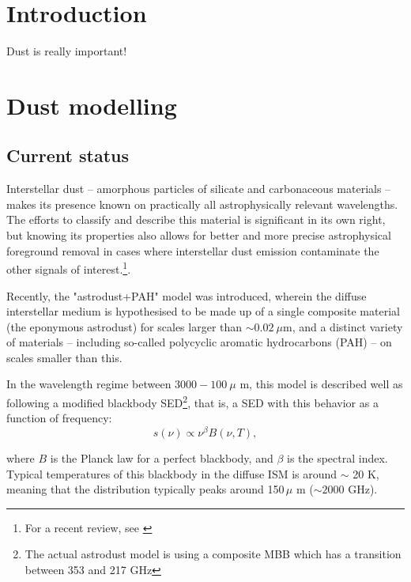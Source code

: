 \documentclass{aa}
\begin{document}
   \maketitle

\setcounter{tocdepth}{2}
\tableofcontents
   
\section{Introduction}
Dust is really important!

\clearpage
\section{Dust modelling}
\subsection{Current status}
Interstellar dust -- amorphous particles of silicate and carbonaceous materials -- makes its presence known on practically all astrophysically relevant wavelengths. The efforts to classify and describe this material is significant in its own right, but knowing its properties also allows for better and more precise astrophysical foreground removal in cases where interstellar dust emission contaminate the other signals of interest.\footnote{For a recent review, see \cite{Hensley2021}}.

Recently, the "astrodust+PAH" model \citep{Hensley2023} was introduced, wherein the diffuse interstellar medium is hypothesised to be made up of a single composite material (the eponymous astrodust) for scales larger than $\sim0.02~\mu$m, and a distinct variety of materials -- including so-called polycyclic aromatic hydrocarbons (PAH) -- on scales smaller than this.

In the wavelength regime between $3000-100~\mu$ m, this model is described well as following a modified blackbody SED\footnote{The actual astrodust model is using a composite MBB which has a transition between 353 and 217 GHz}, that is, a SED with this behavior as a function of frequency:
\begin{equation}
s(\nu) \propto \nu^\beta B(\nu, T),
\label{eq:mbb}
\end{equation}

where $B$ is the Planck law for a perfect blackbody, and $\beta$ is the spectral index. Typical temperatures of this blackbody in the diffuse ISM is around $\sim$ 20 K, meaning that the distribution typically peaks around 150\,$\mu$ m ($\sim 2000$ GHz).
\end{document}
